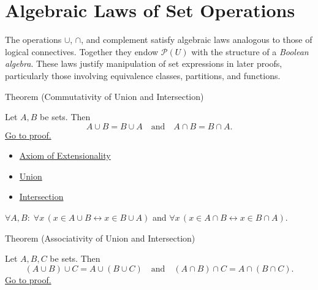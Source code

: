 
\section{Algebraic Laws of Set Operations}


\begin{remark*}
The operations $\cup$, $\cap$, and complement satisfy algebraic laws analogous
to those of logical connectives. Together they endow $\mathcal{P}(U)$ with
the structure of a \emph{Boolean algebra}. These laws justify manipulation
of set expressions in later proofs, particularly those involving equivalence
classes, partitions, and functions.
\end{remark*}

\begin{theorembox}{Theorem (Commutativity of Union and Intersection)}
\begin{theorem}\label{thm:commutativity}
Let $A,B$ be sets. Then
\[
A \cup B = B \cup A
\quad\text{and}\quad
A \cap B = B \cap A.
\]
\hyperref[prf:commutativity]{Go to proof.}
\end{theorem}
\end{theorembox}

\begin{dependencies}
\begin{itemize}
  \item \hyperref[ax:extensionality]{Axiom of Extensionality}
  \item \hyperref[def:union]{Union}
  \item \hyperref[def:intersection]{Intersection}
\end{itemize}
\end{dependencies}

\begin{remark*}
$\forall A, B:\; \forall x\,(x \in A \cup B \leftrightarrow x \in B \cup A)$ and $\forall x\,(x \in A \cap B \leftrightarrow x \in B \cap A)$.
\end{remark*}

\begin{theorembox}{Theorem (Associativity of Union and Intersection)}
\begin{theorem}\label{thm:associativity}
Let $A,B,C$ be sets. Then
\[
(A \cup B) \cup C = A \cup (B \cup C)
\quad\text{and}\quad
(A \cap B) \cap C = A \cap (B \cap C).
\]
\hyperref[prf:associativity]{Go to proof.}
\end{theorem}
\end{theorembox}

